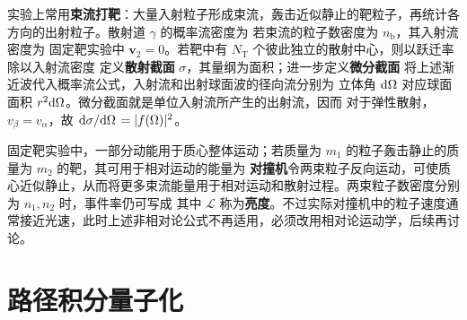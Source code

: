 实验上常用\textbf{束流打靶}：大量入射粒子形成束流，轰击近似静止的靶粒子，再统计各方向的出射粒子。散射道 $\gamma$ 的概率流密度为
若束流的粒子数密度为 $n_{\mathrm b}$，其入射流密度为
固定靶实验中 $\bm v_2=0$。若靶中有 $N_{\mathrm T}$ 个彼此独立的散射中心，则以跃迁率除以入射流密度
定义\textbf{散射截面} $\sigma$，其量纲为面积；进一步定义\textbf{微分截面}
将上述渐近波代入概率流公式，入射流和出射球面波的径向流分别为
立体角 $\dd\Omega$ 对应球面面积 $r^2\dd\Omega$。微分截面就是单位入射流所产生的出射流，因而
对于弹性散射，$v_\beta=v_\alpha$，故 $\dv*{\sigma}{\Omega}=|f(\Omega)|^2$。

固定靶实验中，一部分动能用于质心整体运动；若质量为 $m_1$ 的粒子轰击静止的质量为 $m_2$ 的靶，其可用于相对运动的能量为
\textbf{对撞机}令两束粒子反向运动，可使质心近似静止，从而将更多束流能量用于相对运动和散射过程。两束粒子数密度分别为 $n_1,n_2$ 时，事件率仍可写成
其中 $\mathcal L$ 称为\textbf{亮度}。不过实际对撞机中的粒子速度通常接近光速，此时上述非相对论公式不再适用，必须改用相对论运动学，后续再讨论。

\section{路径积分量子化}


